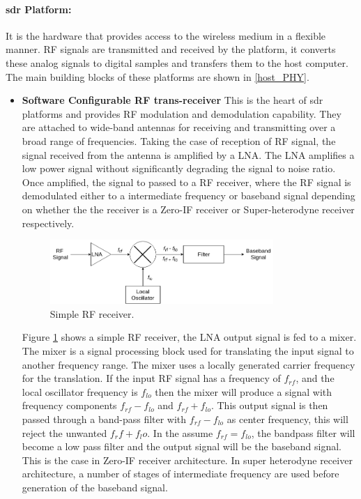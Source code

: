 \paragraph{\ac{sdr} Platform:} It is the hardware that provides access to the wireless medium in a flexible manner.
\ac{RF} signals are transmitted and received by the platform, it converts these analog signals to digital samples and transfers them to the host computer.
The main building blocks of these platforms are shown in \ref{host_PHY}.
\begin{itemize}
\item{\textbf{Software Configurable \ac{RF} trans-receiver}} This is the heart of \ac{sdr} platforms and provides \ac{RF} modulation and demodulation capability.
They are attached to wide-band antennas for receiving and transmitting over a broad range of frequencies.
Taking the case of reception of RF signal, the signal received from the antenna is amplified by a \ac{LNA}.
The \ac{LNA} amplifies a low power signal without significantly degrading the signal to noise ratio.
Once amplified, the signal to passed to a \ac{RF} receiver, where the \ac{RF} signal is demodulated either to a intermediate frequency or baseband signal depending on whether the the receiver is a Zero-IF receiver or Super-heterodyne receiver respectively.\\

\begin{figure}[h!]
\centering
\label{rf_receiver}
\includegraphics[width=0.8\textwidth]{Figure/RF_receiver.png}
\caption{Simple \ac{RF} receiver.}
\end{figure}

Figure \ref{rf_receiver} shows a simple \ac{RF} receiver, the \ac{LNA} output signal is fed to a mixer.
The mixer is a signal processing block used for translating the input signal to another frequency range.
The mixer uses a locally generated carrier frequency for the translation. 
If the input \ac{RF} signal has a frequency of $f_{rf}$, and the local oscillator frequency is $f_{lo}$ then the mixer will produce a signal with frequency components $f_{rf}-f_{lo}$ and $f_{rf}+f_{lo}$.
This output signal is then passed through a band-pass filter with $f_{rf}-f_{lo}$ as center frequency, this will reject the unwanted $f_rf+f_lo$.
In the assume $f_{rf}=f_{lo}$, the bandpass filter will become a low pass filter and the output signal will be the baseband signal.
This is the case in Zero-IF receiver architecture.
In super heterodyne receiver architecture, a number of stages of intermediate frequency are used before generation of the baseband signal.\\


\end{itemize}

